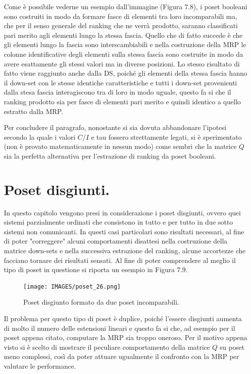\documentclass{report}
\begin{document}
Come è possibile vederne un esempio dall'immagine (Figura 7.8), i poset booleani sono costruiti in modo da formare fasce di elementi tra loro incomparabili ma, che per il senso generale del ranking che ne verrà prodotto, saranno classificati pari merito agli elementi lungo la stessa fascia. Quello che di fatto succede è che gli elementi lungo la fascia sono interscambiabili e nella costruzione della MRP le colonne identificative degli elementi sulla stessa fascia sono costruite in modo da avere esattamente gli stessi valori ma in diverse posizioni. Lo stesso risultato di fatto viene raggiunto anche dalla DS, poiché gli elementi della stessa fascia hanno il down-set con le stesse identiche caratteristiche e tutti i down-set provenienti dalla stesa fascia interagiscono tra di loro in modo uguale, questo fa si che il ranking prodotto sia per fasce di elementi pari merito e quindi identico a quello estratto dalla MRP.


Per concludere il paragrafo, nonostante si sia dovuta abbandonare l'ipotesi secondo la quale i valori $C/I$ e tau fossero strettamente legati, si è sperimentato (non è provato matematicamente in nessun modo) come sembri che la matrice $Q$ sia la perfetta alternativa per l'estrazione di ranking da poset booleani.

\section{Poset disgiunti.}
In questo capitolo vengono presi in considerazione i poset disgiunti, ovvero quei sistemi parzialmente ordinati che consistono in tutto e per tutto in due sotto sistemi non comunicanti. In questi casi particolari sono risultati necessari, al fine di poter "correggere" alcuni comportamenti disattesi nella costruzione della matrice down-sets e nella successiva estrazione del ranking, alcune accortezze che facciano tornare dei risultati sensati.
Al fine di poter comprendere al meglio il tipo di poset in questione si riporta un esempio in Figura 7.9.

\begin{figure}[H]
    \centering
    \texttt{[image: IMAGES/poset\_26.png]}
    \caption{Poset disgiunto formato da due poset incomparabili.}
    \label{fig:roc}
\end{figure}

Il problema per questo tipo di poset è duplice, poiché l'essere disgiunti aumenta di molto il numero delle estensioni lineari e questo fa si che, ad esempio per il poset appena citato, computare la MRP sia troppo oneroso. Per il motivo appena visto si è scelto di mostrare il peculiare comportamento della matrice $Q$ su poset meno complessi, così da poter attuare ugualmente il confronto con la MRP per valutare le performance.
\end{document}
